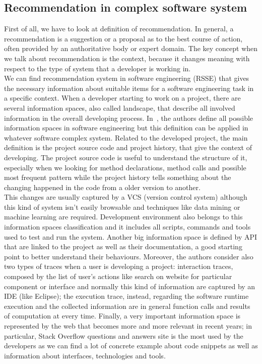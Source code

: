 \subsection{Recommendation in complex software system}
First of all, we have to look at definition of recommendation.  In general, a recommendation is a suggestion or a proposal as to the best course of action, often provided by an authoritative body or expert domain. The key concept when we talk about recommendation is the context, because it changes meaning with respect to the type of system that a developer is working in. \\
We can find recommendation system in software engineering (RSSE) that gives the necessary information about suitable items for a software engineering task in a specific context. When a developer starting to work on a project, there are several information spaces, also called landscape, that describe all involved information in the overall developing process. In~\cite{martin_p.robillard_introduction_2009}, the authors define all possible information spaces in software engineering but this definition can be applied in whatever software complex system. Related to the developed project, the main definition is the project source code and project history, that give the context of developing. The project source code is useful to understand the structure of it, especially when we looking for method declarations, method calls and possible most frequent pattern while the project history tells something about the changing happened in the code from a older version to another. \\
This changes are usually captured by a VCS (version control system) although this kind of system isn't easily browsable and techniques like data mining or machine learning are required. Development environment also belongs to this information spaces classification and it includes all scripts, commands and tools used to test and run the system. Another big information space is defined by API that are linked to the project as well as their documentation, a good starting point to better understand their behaviours. Moreover, the authors consider also two types of traces when a user is developing a project: interaction traces, composed by the list of user's actions like search on website for particular component or interface and normally this kind of information are captured by an IDE (like Eclipse); the execution trace, instead, regarding the software runtime execution and the collected information are in general function calls and results of computation at every time. Finally, a very important information space is represented by the web that becomes more and more relevant in recent years; in particular, Stack Overflow questions and answers site is the most used by the developers as we can find a lot of concrete example about code snippets as well as information about interfaces, technologies and tools. \\
